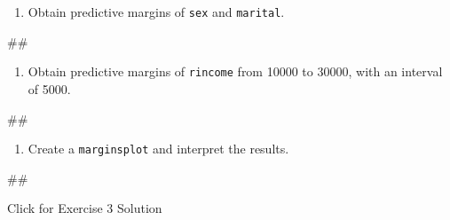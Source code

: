 \documentclass[
]{book}
\newenvironment{Shaded}{\begin{snugshade}}{\end{snugshade}}
\newcommand{\NormalTok}[1]{#1}
\providecommand{\tightlist}{%
  \setlength{\itemsep}{0pt}\setlength{\parskip}{0pt}}
\begin{document}
\begin{enumerate}
\def\labelenumi{\arabic{enumi}.}
\setcounter{enumi}{1}
\tightlist
\item
  Obtain predictive margins of \texttt{sex} and \texttt{marital}.
\end{enumerate}

\begin{Shaded}
\begin{Highlighting}[]
\NormalTok{\#\#}
\end{Highlighting}
\end{Shaded}

\begin{enumerate}
\def\labelenumi{\arabic{enumi}.}
\setcounter{enumi}{2}
\tightlist
\item
  Obtain predictive margins of \texttt{rincome} from 10000 to 30000, with an interval of 5000.
\end{enumerate}

\begin{Shaded}
\begin{Highlighting}[]
\NormalTok{\#\#}
\end{Highlighting}
\end{Shaded}

\begin{enumerate}
\def\labelenumi{\arabic{enumi}.}
\setcounter{enumi}{3}
\tightlist
\item
  Create a \texttt{marginsplot} and interpret the results.
\end{enumerate}

\begin{Shaded}
\begin{Highlighting}[]
\NormalTok{\#\# }
\end{Highlighting}
\end{Shaded}

{Click for Exercise 3 Solution}
\end{document}
